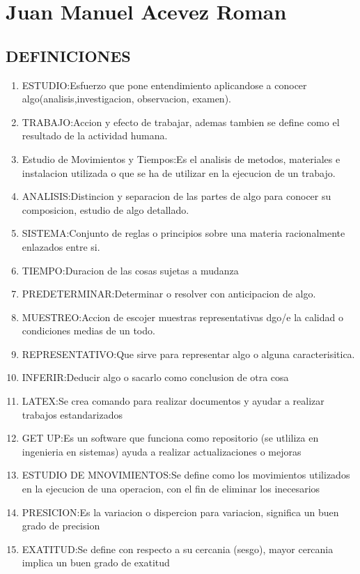 \section{Juan Manuel Acevez Roman}
\subsection{DEFINICIONES}

\begin{enumerate}
    \item ESTUDIO:Esfuerzo que pone entendimiento aplicandose a conocer algo(analisis,investigacion, observacion, examen).
    \item TRABAJO:Accion y efecto de trabajar, ademas tambien se define como el resultado de la actividad humana.
    \item Estudio de Movimientos y Tiempos:Es el analisis de metodos, materiales e instalacion utilizada o que se ha de utilizar en la ejecucion de un trabajo.
    \item ANALISIS:Distincion y separacion de las partes de algo para conocer su composicion, estudio de algo detallado.
    \item SISTEMA:Conjunto de reglas o principios sobre una materia racionalmente enlazados entre si.
    \item TIEMPO:Duracion de las cosas sujetas a mudanza 
    \item PREDETERMINAR:Determinar o resolver con anticipacion de algo.
    \item MUESTREO:Accion de escojer muestras representativas dgo/e la calidad o condiciones medias de un todo.
    \item REPRESENTATIVO:Que sirve para representar algo o alguna caracterisitica.
    \item INFERIR:Deducir algo o sacarlo como conclusion de otra cosa
    \item LATEX:Se crea comando para realizar documentos y ayudar a realizar trabajos estandarizados 
    \item GET UP:Es un software que funciona como repositorio (se utliliza en ingenieria en sistemas) ayuda a realizar actualizaciones o mejoras 
    \item ESTUDIO DE MNOVIMIENTOS:Se define como los movimientos utilizados en la ejecucion de una operacion, con el fin de eliminar los inecesarios
    \item PRESICION:Es la variacion o dispercion para variacion, significa un buen grado de precision 
    \item EXATITUD:Se define con respecto a su cercania (sesgo), mayor cercania implica un buen grado de exatitud

\end{enumerate}
